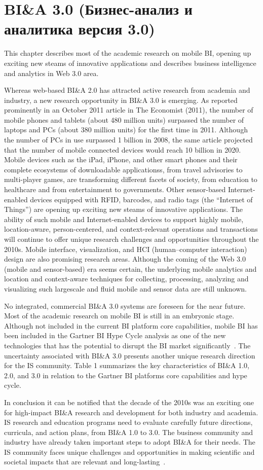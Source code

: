 \section{BI\&A 3.0 (Бизнес-анализ и аналитика версия 3.0)}
This chapter describes most of the academic research on mobile BI, opening up exciting new steams of innovative applications and describes business intelligence and analytics in Web 3.0 area.

Whereas web-based BI\&A 2.0 has attracted active research
from academia and industry, a new research opportunity in
BI\&A 3.0 is emerging. As reported prominently in an
October 2011 article in The Economist (2011), the number of
mobile phones and tablets (about 480 million units) surpassed
the number of laptops and PCs (about 380 million units) for
the first time in 2011. Although the number of PCs in use
surpassed 1 billion in 2008, the same article projected that the
number of mobile connected devices would reach 10 billion
in 2020. Mobile devices such as the iPad, iPhone, and other
smart phones and their complete ecosystems of downloadable
applicationss, from travel advisories to multi-player games,
are transforming different facets of society, from education to
healthcare and from entertainment to governments. Other
sensor-based Internet-enabled devices equipped with RFID,
barcodes, and radio tags (the “Internet of Things”) are
opening up exciting new steams of innovative applications.
The ability of such mobile and Internet-enabled devices to
support highly mobile, location-aware, person-centered, and
context-relevant operations and transactions will continue to
offer unique research challenges and opportunities throughout
the 2010s. Mobile interface, visualization, and HCI
(human–computer interaction) design are also promising
research areas. Although the coming of the Web 3.0 (mobile
and sensor-based) era seems certain, the underlying mobile
analytics and location and context-aware techniques for
collecting, processing, analyzing and visualizing such largescale
and fluid mobile and sensor data are still unknown.

No integrated, commercial BI\&A 3.0 systems are foreseen for
the near future. Most of the academic research on mobile BI
is still in an embryonic stage. Although not included in the
current BI platform core capabilities, mobile BI has been
included in the Gartner BI Hype Cycle analysis as one of the
new technologies that has the potential to disrupt the BI
market significantly~\cite{Blei:2012}. The uncertainty associated
with BI\&A 3.0 presents another unique research
direction for the IS community.
Table 1 summarizes the key characteristics of BI\&A 1.0, 2.0,
and 3.0 in relation to the Gartner BI platforms core capabilities
and hype cycle.

In conclusion it can be notified that the decade of the 2010s was an exciting one for high-impact BI\&A research and development for both industry and academia. IS research and education programs
need to evaluate carefully future directions, curricula,
and action plans, from BI\&A 1.0 to 3.0. The business community and industry have already taken important steps to adopt BI\&A for their needs. The IS community faces unique challenges and opportunities
in making scientific and societal impacts that are relevant and
long-lasting~\cite{Chen:2006}. 